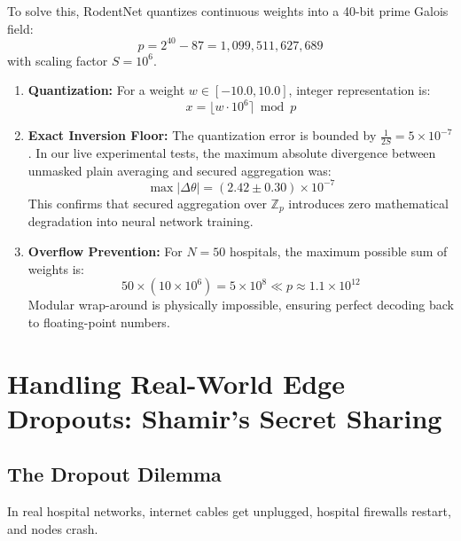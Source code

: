 \documentclass[11pt,a4paper]{report}
\begin{document}
To solve this, RodentNet quantizes continuous weights into a 40-bit prime Galois field:
\begin{equation}
p = 2^{40} - 87 = 1{,}099{,}511{,}627{,}689
\end{equation}
with scaling factor $S = 10^6$.
\begin{enumerate}[itemsep=2pt]
  \item \textbf{Quantization:} For a weight $w \in [-10.0, 10.0]$, integer representation is:
  \begin{equation}
  x = \lfloor w \cdot 10^6 \rceil \bmod p
  \end{equation}
  \item \textbf{Exact Inversion Floor:} The quantization error is bounded by $\frac{1}{2S} = 5 \times 10^{-7}$. In our live experimental tests, the maximum absolute divergence between unmasked plain averaging and secured aggregation was:
  \begin{equation}
  \max |\Delta\theta| = (2.42 \pm 0.30) \times 10^{-7}
  \end{equation}
  This confirms that secured aggregation over $\mathbb{Z}_p$ introduces zero mathematical degradation into neural network training.
  \item \textbf{Overflow Prevention:} For $N = 50$ hospitals, the maximum possible sum of weights is:
  \begin{equation}
  50 \times (10 \times 10^6) = 5 \times 10^8 \ll p \approx 1.1 \times 10^{12}
  \end{equation}
  Modular wrap-around is physically impossible, ensuring perfect decoding back to floating-point numbers.
\end{enumerate}

\chapter{Handling Real-World Edge Dropouts: Shamir's Secret Sharing}
\label{chap:dropout}

\section{The Dropout Dilemma}
In real hospital networks, internet cables get unplugged, hospital firewalls restart, and nodes crash.
\end{document}
